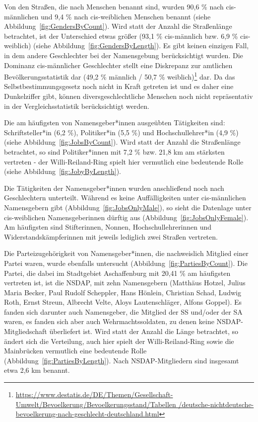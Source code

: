 \documentclass[ngerman,twocolumn,showpacs,%
  nofootinbib,aps,superscriptaddress,%
  eqsecnum,prd,notitlepage,showkeys,10pt,report]{revtex4-2}
\begin{document}
Von den Straßen, die nach Menschen benannt sind, wurden 90,6 \% nach cis-männlichen
und 9,4 \% nach cis-weiblichen Menschen benannt (siehe Abbildung~\ref{fig:GendersByCount}). Wird statt der Anzahl die Straßenlänge
betrachtet, ist der Unterschied etwas größer (93,1 \% cis-männlich bzw. 6,9 \% cis-weiblich) (siehe Abbildung~\ref{fig:GendersByLength}).
Es gibt keinen einzigen Fall, in dem andere Geschlechter bei der Namensgebung
berücksichtigt wurden.
Die Dominanz cis-männlicher Geschlechter stellt eine Diskrepanz zur amtlichen
Bevölkerungsstatistik dar (49,2 \% männlich / 50,7 \% weiblich)\footnote{\url{https://www.destatis.de/DE/Themen/Gesellschaft-Umwelt/Bevoelkerung/Bevoelkerungsstand/Tabellen
/deutsche-nichtdeutsche-bevoelkerung-nach-geschlecht-deutschland.html}} dar. Da das
Selbstbestimmungsgesetz noch nicht in Kraft getreten ist und es daher eine Dunkelziffer
gibt, können diversgeschlechtliche Menschen noch nicht repräsentativ in der
Vergleichsstatistik berücksichtigt werden.



Die am häufigsten von Namensgeber*innen ausgeübten Tätigkeiten sind: Schriftsteller*in
(6,2 \%), Politiker*in (5,5 \%) und Hochschullehrer*in (4,9 \%) (siehe Abbildung~\ref{fig:JobsByCount}). Wird statt der Anzahl die
Straßenlänge betrachtet, so sind Politiker*innen mit 7,2 \% bzw. 21,8 km am stärksten
vertreten - der Willi-Reiland-Ring spielt hier vermutlich eine bedeutende Rolle (siehe Abbildung~\ref{fig:JobyByLength}).



Die Tätigkeiten der Namensgeber*innen wurden anschließend noch nach Geschlechtern
unterteilt. Während es keine Auffälligkeiten unter cis-männlichen Namensgebern gibt (Abbildung~\ref{fig:JobsOnlyMale}), so
sieht die Datenlage unter cis-weiblichen Namensgeberinnen dürftig aus (Abbildung~\ref{fig:JobsOnlyFemale}). Am häufigsten sind
Stifterinnen, Nonnen, Hochschullehrerinnen und Widerstandskämpferinnen mit jeweils
lediglich zwei Straßen vertreten.



Die Parteizugehörigkeit von Namensgeber*innen, die nachweislich Mitglied einer Partei
waren, wurde ebenfalls untersucht (Abbildung~\ref{fig:PartiesByCount}). Die Partei, die dabei im Stadtgebiet Aschaffenburg mit
20,41 \% am häufigsten vertreten ist, ist die NSDAP, mit zehn Namensgebern (Matthäus
Hotzel, Julius Maria Becker, Paul Rudolf Scheppler, Hans Hönlein, Christian Schad, Ludwig
Roth, Ernst Streun, Albrecht Velte, Aloys Lautenschläger, Alfons Goppel). Es fanden sich
darunter auch Namensgeber, die Mitglied der SS und/oder der SA waren, es fanden sich
aber auch Wehrmachtssoldaten, zu denen keine NSDAP-Mitgliedschaft überliefert ist.
Wird statt der Anzahl die Länge betrachtet, so ändert sich die Verteilung, auch hier spielt der
Willi-Reiland-Ring sowie die Mainbrücken vermutlich eine bedeutende Rolle (Abbildung~\ref{fig:PartiesByLength}). Nach
NSDAP-Mitgliedern sind insgesamt etwa 2,6 km benannt.
\end{document}
